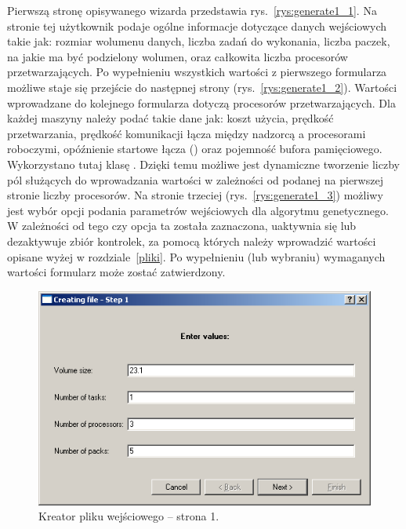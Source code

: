 Pierwszą stronę opisywanego wizarda przedstawia rys.~\vref{rys:generate1_1}. Na stronie tej użytkownik podaje 
ogólne informacje dotyczące danych wejściowych takie jak: rozmiar wolumenu danych, liczba zadań do wykonania, liczba paczek, na jakie ma być podzielony 
wolumen, oraz całkowita liczba procesorów przetwarzających. Po wypełnieniu wszystkich wartości z pierwszego formularza możliwe staje się przejście do następnej strony 
(rys.~\vref{rys:generate1_2}). Wartości wprowadzane do kolejnego formularza dotyczą procesorów przetwarzających. 
Dla każdej maszyny należy podać takie dane jak: koszt użycia, prędkość przetwarzania, prędkość komunikacji łącza między nadzorcą a procesorami 
roboczymi, opóźnienie startowe łącza () oraz pojemność bufora pamięciowego. Wykorzystano tutaj klasę . 
Dzięki temu możliwe jest dynamiczne tworzenie liczby pól służących do wprowadzania wartości w zależności od podanej na pierwszej stronie liczby 
procesorów. Na stronie trzeciej (rys.~\vref{rys:generate1_3}) możliwy jest wybór opcji podania parametrów wejściowych dla algorytmu genetycznego. 
W zależności od tego czy opcja ta została zaznaczona, uaktywnia się lub dezaktywuje zbiór kontrolek, za 
pomocą których należy wprowadzić wartości opisane wyżej w rozdziale~\vref{pliki}. Po wypełnieniu (lub wybraniu) wymaganych wartości formularz 
może zostać zatwierdzony.

\begin{figure}[htp]
\centering\includegraphics[scale=0.7]{figures/screens/generate1_1.png}
\caption{Kreator pliku wejściowego -- strona 1.}\label{rys:generate1_1}
\end{figure}

